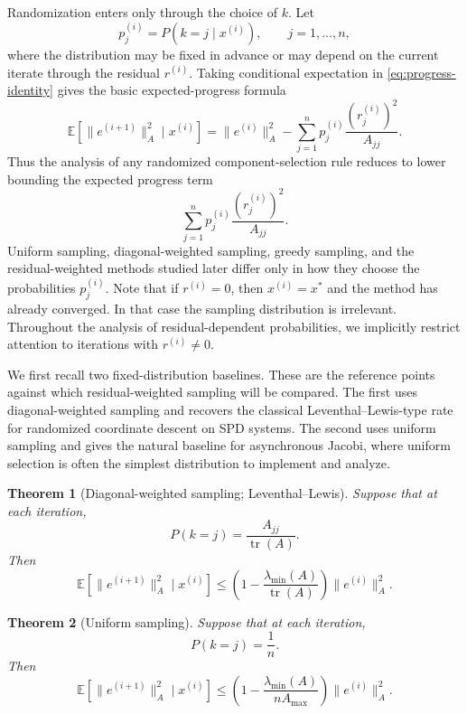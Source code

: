 \documentclass[pdflatex,sn-mathphys-num]{sn-jnl}%
\DeclareMathOperator{\Tr}{tr}
\newcommand{\E}{\mathbb{E}}
\newcommand{\Anorm}[1]{\|#1\|_{A}}
\newcommand{\lmin}{\lambda_{\min}}
\theoremstyle{thmstyleone}%
\newtheorem{theorem}{Theorem}%
\theoremstyle{thmstyletwo}%
\theoremstyle{thmstylethree}%
\begin{document}
Randomization enters only through the choice of $k$.  Let
\[
    p_j^{(i)} = P(k=j \mid x^{(i)}), \qquad j=1,\ldots,n,
\]
where the distribution may be fixed in advance or may depend on the current
iterate through the residual $r^{(i)}$.  Taking conditional expectation in
\eqref{eq:progress-identity} gives the basic expected-progress formula
\begin{equation}
\label{eq:expected-progress-general}
    \E\!\left[\Anorm{e^{(i+1)}}^2 \mid x^{(i)}\right]
    =
    \Anorm{e^{(i)}}^2
    -
    \sum_{j=1}^n p_j^{(i)}
    \frac{(r_j^{(i)})^2}{A_{jj}} .
\end{equation}
Thus the analysis of any randomized component-selection rule reduces to lower
bounding the expected progress term
\[
    \sum_{j=1}^n p_j^{(i)}
    \frac{(r_j^{(i)})^2}{A_{jj}}.
\]
Uniform sampling, diagonal-weighted sampling, greedy sampling, and the
residual-weighted methods studied later differ only in how they choose the
probabilities $p_j^{(i)}$.
Note that if $r^{(i)}=0$, then $x^{(i)}=x^*$ and the method has already converged.  In
that case the sampling distribution is irrelevant.  Throughout the analysis of
residual-dependent probabilities, we implicitly restrict attention to iterations
with $r^{(i)} \neq 0$.



We first recall two fixed-distribution baselines.  These are the reference
points against which residual-weighted sampling will be compared.  The first
uses diagonal-weighted sampling and recovers the classical
Leventhal--Lewis-type rate for randomized coordinate descent on SPD systems.  The
second uses uniform sampling and gives the natural baseline for asynchronous
Jacobi, where uniform selection is often the simplest distribution to implement
and analyze.

\begin{theorem}[Diagonal-weighted sampling; Leventhal--Lewis]
\label{thm:leventhal-lewis}
Suppose that at each iteration,
\[
    P(k=j) = \frac{A_{jj}}{\Tr(A)}.
\]
Then
\[
    \E\!\left[\Anorm{e^{(i+1)}}^2 \mid x^{(i)}\right]
    \leq
    \left(1 - \frac{\lmin(A)}{\Tr(A)}\right)
    \Anorm{e^{(i)}}^2.
\]
\end{theorem}

\begin{theorem}[Uniform sampling]
\label{thm:uniform}
Suppose that at each iteration,
\[
    P(k=j) = \frac{1}{n}.
\]
Then
\[
    \E\!\left[\Anorm{e^{(i+1)}}^2 \mid x^{(i)}\right]
    \leq
    \left(1 - \frac{\lmin(A)}{n A_{\max}}\right)
    \Anorm{e^{(i)}}^2.
\]
\end{theorem}
\end{document}
